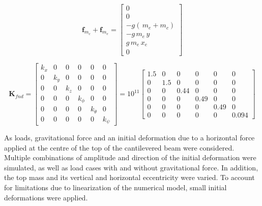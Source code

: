 \documentclass{article}
\begin{document}
\begin{small}
    \begin{equation}
        \mathbf{f}_{m_c} + \mathbf{f}_{m_e} = 
        \begin{bmatrix}
         0\\ 0\\ -g(\,m_{e}+m_{c})\\ -g\,m_{e}\,y   \\ g\,m_{e}\,x_{e} \\ 0
        \end{bmatrix}
        \label{eq:fea:Fstat}
    \end{equation}
\end{small}

\begin{small}
    \begin{equation}
        \mathbf{K}_{fnd} =
        \begin{bmatrix}
         k_{x} &     0 & 0     & 0         & 0           & 0         \\ 
         0     & k_{y} & 0     & 0         & 0           & 0         \\
         0     & 0     & k_{z} & 0         & 0           & 0         \\
         0     & 0     & 0     & k_{\phi } & 0           & 0         \\
         0     & 0     & 0     & 0         & k_{\theta } & 0         \\ 
         0     & 0     & 0     & 0         & 0           & k_{\psi } 
        \end{bmatrix}
        = 10^{11}
        \begin{bmatrix}
         1.5 & 0 & 0 & 0 & 0 & 0\\ 
         0 &  1.5 & 0 & 0 & 0 & 0\\ 
         0 & 0 & 0.44 & 0 & 0 & 0\\ 
         0 & 0 & 0 & 0.49 & 0 & 0\\ 
         0 & 0 & 0 & 0 & 0.49 & 0\\ 
         0 & 0 & 0 & 0 & 0 &  0.094 
        \end{bmatrix}
        \label{eq:fea:K_fnd}
    \end{equation}
\end{small}



As loads, gravitational force and an initial deformation due to a horizontal force applied at the centre of the top of the cantilevered beam were considered. Multiple combinations of amplitude and direction of the initial deformation were simulated, as well as load cases with and without gravitational force. In addition, the top mass and its vertical and horizontal eccentricity were varied. To account for limitations due to linearization of the numerical model, small initial deformations were applied.
\end{document}

